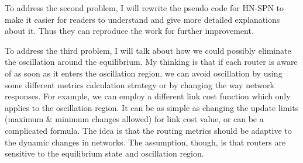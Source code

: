 \documentclass[11pt]{article}
\begin{document}
To address the second problem, I will rewrite the pseudo code for
HN-SPN to make it easier for readers to understand and give more
detailed explanations about it. Thus they can reproduce the
work for further improvement.

To address the third problem, I will talk about how we could possibly
eliminate the oscillation around the equilibrium. My thinking is that
if each router is aware of as soon as it enters the oscillation region,
we can avoid oscillation by using some different metrics calculation
strategy or by changing the way network responses. For example, we can
employ a different link cost function which only applies to the
oscillation region. It can be as simple as changing the update limits
(maximum \& minimum changes allowed) for link cost value, or can be a
complicated formula. The idea is that the routing metrics should
be adaptive to the dynamic changes in networks. The assumption,
though, is that routers are sensitive to the equilibrium state and
oscillation region.
\end{document}
